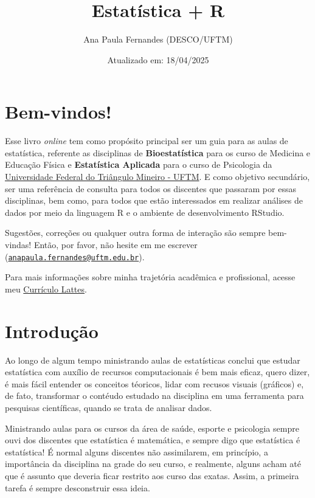 \documentclass[
]{book}
\title{Estatística + R}
\author{Ana Paula Fernandes (DESCO/UFTM)}
\date{Atualizado em: 18/04/2025}
\begin{document}
\maketitle

{
\setcounter{tocdepth}{1}
\tableofcontents
}
\chapter{Bem-vindos!}\label{bem-vindos}

Esse livro \emph{online} tem como propósito principal ser um guia para as aulas de estatística, referente as disciplinas de \textbf{Bioestatística} para os curso de Medicina e Educação Física e \textbf{Estatística Aplicada} para o curso de Psicologia da \href{http://www.uftm.edu.br}{Universidade Federal do Triângulo Mineiro - UFTM}. E como objetivo secundário, ser uma referência de consulta para todos os discentes que passaram por essas disciplinas, bem como, para todos que estão interessados em realizar análises de dados por meio da linguagem R e o ambiente de desenvolvimento RStudio.

Sugestões, correções ou qualquer outra forma de interação são sempre bem-vindas! Então, por favor, não hesite em me escrever (\href{mailto:anapaula.fernandes@uftm.edu.br}{\nolinkurl{anapaula.fernandes@uftm.edu.br}}).

Para mais informações sobre minha trajetória acadêmica e profissional, acesse meu \href{https://lattes.cnpq.br/5582801060910261}{Currículo Lattes}.

\chapter{Introdução}\label{intro}

Ao longo de algum tempo ministrando aulas de estatísticas conclui que estudar estatística com auxílio de recursos computacionais é bem mais eficaz, quero dizer, é mais fácil entender os conceitos téoricos, lidar com recusos visuais (gráficos) e, de fato, transformar o contéudo estudado na disciplina em uma ferramenta para pesquisas científicas, quando se trata de analisar dados.

Ministrando aulas para os cursos da área de saúde, esporte e psicologia sempre ouvi dos discentes que estatística é matemática, e sempre digo que estatística é estatística! É normal alguns discentes não assimilarem, em princípio, a importância da disciplina na grade do seu curso, e realmente, alguns acham até que é assunto que deveria ficar restrito aos curso das exatas. Assim, a primeira tarefa é sempre desconstruir essa ideia.
\end{document}
